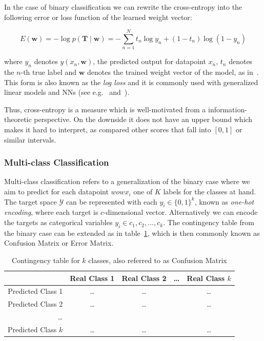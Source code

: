 In the case of binary classification we can rewrite the cross-entropy into the following error or loss function of the learned weight vector:

\begin{equation}
  E(\mathbf{w}) =  -\log p(\mathbf{T} \mid \mathbf{w}) = - \sum_{n=1}^N {t_n \log y_n + (1 - t_n) \log (1 - y_n)}
\end{equation}

where $y_n$ denotes $y(x_n, \mathbf{w})$, the predicted output for datapoint $x_n$, $t_n$ denotes the $n$-th true label and $\mathbf{w}$ denotes the trained weight vector of the model, as in~\cite[Chapter 4.3.2, p.~205 ]{Bishop:2006aa}. This form is also known as the \emph{log loss} and it is commonly used with generalized linear models and \glspl{NN} (see e.g.~\cite[Chapter 4.3.2, p.~205 ]{Bishop:2006aa} and~\cite[Chapter 10.7, p.~251 ]{Alpaydin:2014aa}).

Thus, cross-entropy is a measure which is well-motivated from a information-theoretic perspective. On the downside it does not have an upper bound which makes it hard to interpret, as compared other scores that fall into $[0, 1]$ or similar intervals.

\subsubsection*{Multi-class Classification}
\label{subs:Multi-class Classification}

Multi-class classification refers to a generalization of the binary case where we aim to predict for each datapoint $wowx_i$ one of $K$ labels for the classes at hand. The target space $\mathcal{Y}$ can be represented with each $y_i \in \{ 0,1 \}^k$, known as \emph{one-hot encoding}, where each target is $c$-dimensional vector. Alternatively we can encode the targets as categorical variables $y_i \in {c_1, c_2, \ldots, c_k}$. The contingency table from the binary case can be extended as in table~\ref{table:contingency-table-k}, which is then commonly known as
\gls{Confusion Matrix} or \gls{Error Matrix}.

\begin{center}
  \begin{table}[h]
  \begin{tabular}{r | c c c c }
    & Real Class 1 & Real Class 2 & \ldots & Real Class $k$ \\
    \hline
    Predicted Class 1    & \ldots & \ldots & & \ldots \\
    Predicted Class 2    & \ldots & \ldots & & \ldots \\
    \ldots               & & & & \\
    Predicted Class $k$  & \ldots & \ldots & & \ldots \\
  \end{tabular}
  \caption{Contingency table for $k$ classes, also referred to as Confusion Matrix}
\label{table:contingency-table-k}
\end{table}
\end{center}


